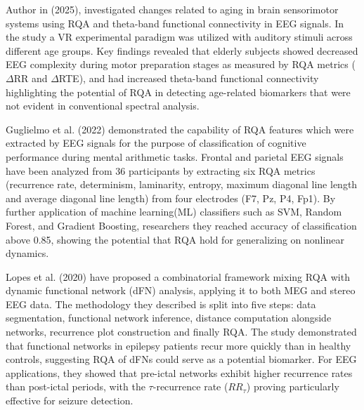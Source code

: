 \documentclass{article}
\begin{document}
			Author in\cite{pitsik} (2025), investigated changes related to aging in brain sensorimotor systems using 
			RQA and theta-band functional connectivity in EEG signals. 
			In the study a VR experimental paradigm was utilized with auditory 
			stimuli across different age groups. 
			Key findings revealed that elderly subjects showed decreased EEG complexity during motor preparation stages as 
			measured by RQA metrics ($\Delta$RR and $\Delta$RTE), 
			and had increased theta-band functional connectivity highlighting the potential of RQA in detecting 
			age-related biomarkers that were not evident in conventional spectral analysis. 

			Guglielmo et al. (2022)\cite{guglielmo} demonstrated the capability of 
			RQA features which were extracted by EEG signals for the purpose of classification
			of cognitive performance during mental arithmetic tasks. Frontal and parietal EEG signals 
			have been analyzed from 36 participants by extracting six RQA metrics (recurrence rate, determinism, 
			laminarity, entropy, maximum diagonal line length and average diagonal line length) from four electrodes (F7, Pz, P4, Fp1). 
			By further application of machine learning(ML) classifiers such as SVM, 
			Random Forest, and Gradient Boosting, researchers
			they reached accuracy of classification above 0.85, 
			showing the potential that RQA hold for generalizing on nonlinear dynamics.

			Lopes et al. (2020)\cite{lopes} have proposed a combinatorial framework 
			mixing RQA with dynamic functional network (dFN) analysis,
			applying it to both MEG and stereo EEG data. 
			The methodology they described is split into five steps: data segmentation, 
			functional network inference, distance computation alongside networks, 
			recurrence plot construction and finally RQA. 
			The study demonstrated that functional networks in epilepsy 
			patients recur more quickly than in healthy controls, suggesting RQA of 
			dFNs could serve as a potential biomarker.
			For EEG applications, they showed that pre-ictal networks exhibit higher recurrence rates 
			than post-ictal periods, with the $\tau$-recurrence rate ($RR_{\tau}$) proving particularly 
			effective for seizure detection.
\end{document}

